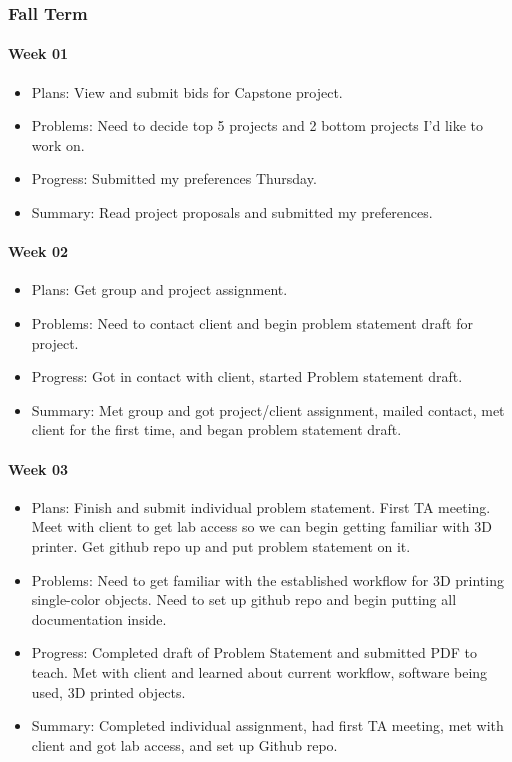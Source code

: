 \subsubsection{Fall Term}
\paragraph{Week 01}
\begin{itemize}
\item Plans: View and submit bids for Capstone project. 
\item Problems: Need to decide top 5 projects and 2 bottom projects I'd like to work on.
\item Progress: Submitted my preferences Thursday. 
\item Summary: Read project proposals and submitted my preferences. 
\end{itemize}
\paragraph{Week 02}
\begin{itemize}
\item Plans: Get group and project assignment.
\item Problems: Need to contact client and begin problem statement draft for project. 
\item Progress: Got in contact with client, started Problem statement draft.
\item Summary: Met group and got project/client assignment, mailed contact, met client for the first time, and began problem statement draft. 
\end{itemize}
\paragraph{Week 03}
\begin{itemize}
\item Plans: Finish and submit individual problem statement. 
First TA meeting. 
Meet with client to get lab access so we can begin getting familiar with 3D printer. 
Get github repo up and put problem statement on it.
\item Problems: Need to get familiar with the established workflow for 3D printing single-color objects.
Need to set up github repo and begin putting all documentation inside.
\item Progress: Completed draft of Problem Statement and submitted PDF to teach. 
Met with client and learned about current workflow, software being used, 3D printed objects.
\item Summary: Completed individual assignment, had first TA meeting, met with client and got lab access, and set up Github repo.
\end{itemize}

